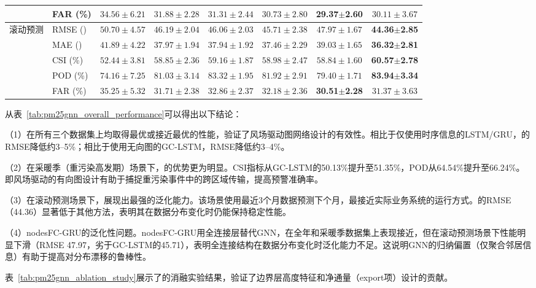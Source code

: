 \begin{table}[htbp]
{\begin{tabular}{@{}clcccccc@{}}
        & FAR (\%) & $34.56\pm6.21$ & $31.88\pm2.28$ & $31.31\pm2.44$ & $30.73\pm2.80$ & \textbf{29.37}$\pm$\textbf{2.60} & $30.11\pm3.67$ \\
        \midrule
        \multirow{5}{*}{滚动预测} 
        & RMSE (\ug{}) & $50.70\pm4.57$ & $46.19\pm2.04$ & $46.06\pm2.03$ & $45.71\pm2.38$ & $47.97\pm1.67$ & \textbf{44.36}$\pm$\textbf{2.85} \\
        & MAE (\ug{}) & $41.89\pm4.22$ & $37.97\pm1.94$ & $37.94\pm1.92$ & $37.46\pm2.29$ & $39.03\pm1.65$ & \textbf{36.32}$\pm$\textbf{2.81} \\
        & CSI (\%) & $52.44\pm3.81$ & $58.85\pm2.36$ & $59.16\pm1.87$ & $58.98\pm2.47$ & $58.84\pm1.60$ & \textbf{60.57}$\pm$\textbf{2.78} \\
        & POD (\%) & $74.16\pm7.25$ & $81.03\pm3.14$ & $83.32\pm1.95$ & $81.92\pm2.91$ & $79.40\pm1.71$ & \textbf{83.94}$\pm$\textbf{3.34} \\
        & FAR (\%) & $35.25\pm5.32$ & $31.71\pm2.38$ & $32.86\pm2.37$ & $32.18\pm2.36$ & \textbf{30.51}$\pm$\textbf{2.28} & $31.37\pm3.63$ \\
        \bottomrule
    \end{tabular}}
\end{table}

从表~\ref{tab:pm25gnn_overall_performance}可以得出以下结论：

（1）\ModelPred{}在所有三个数据集上均取得最优或接近最优的性能，验证了风场驱动图网络设计的有效性。相比于仅使用时序信息的LSTM/GRU，\ModelPred{}的RMSE降低约3--5\%；相比于使用无向图的GC-LSTM，RMSE降低约3--4\%。

（2）在采暖季（重污染高发期）场景下，\ModelPred{}的优势更为明显。CSI指标从GC-LSTM的50.13\%提升至51.35\%，POD从64.54\%提升至66.24\%。即风场驱动的有向图设计有助于捕捉重污染事件中的跨区域传输，提高预警准确率。

（3）在滚动预测场景下，\ModelPred{}展现出最强的泛化能力。该场景使用最近3个月数据预测下个月，最接近实际业务系统的运行方式。\ModelPred{}的RMSE（44.36）显著低于其他方法，表明其在数据分布变化时仍能保持稳定性能。

（4）nodesFC-GRU的泛化性问题。nodesFC-GRU用全连接层替代GNN，在全年和采暖季数据集上表现接近\ModelPred，但在滚动预测场景下性能明显下滑（RMSE 47.97，劣于GC-LSTM的45.71），表明全连接结构在数据分布变化时泛化能力不足。这说明GNN的归纳偏置（仅聚合邻居信息）有助于提高对分布漂移的鲁棒性。

表~\ref{tab:pm25gnn_ablation_study}展示了\ModelPred{}的消融实验结果，验证了边界层高度特征和净通量（export项）设计的贡献。

